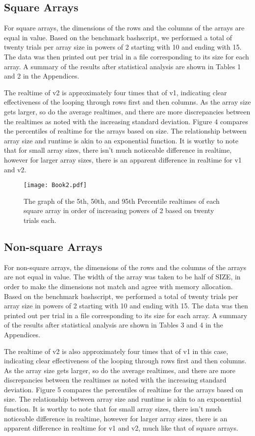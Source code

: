 \documentclass[a4paper]{article}
\begin{document}
\subsection{Square Arrays}
For square arrays, the dimensions of the rows and the columns of the arrays are equal in value. Based on the benchmark bashscript, we performed a total of twenty trials per array size in powers of 2 starting with 10 and ending with 15. The data was then printed out per trial in a file corresponding to its size for each array. A summary of the results after statistical analysis are shown in Tables 1 and 2 in the Appendices. 

The realtime of v2 is approximately four times that of v1, indicating clear effectiveness of the looping through rows first and then columns. As the array size gets larger,  so do the average realtimes, and there are more discrepancies between the realtimes as noted with the increasing standard deviation. Figure 4 compares the percentiles of realtime for the arrays based on size. The relationship between array size and runtime is akin to an exponential function. It is worthy to note that for small array sizes, there isn't much noticeable difference in realtime, however for larger array sizes, there is an apparent difference in realtime for v1 and v2.

\begin{figure}[H]
\centering
\texttt{[image: Book2.pdf]}
\caption{\label{fig:bashscript}The graph of the 5th, 50th, and 95th Percentile realtimes of each square array in order of increasing powers of 2 based on twenty trials each.}
\end{figure}

\subsection{Non-square Arrays}
For non-square arrays, the dimensions of the rows and the columns of the arrays are not equal in value. The width of the array was taken to be half of SIZE, in order to make the dimensions not match and agree with memory allocation. Based on the benchmark bashscript, we performed a total of twenty trials per array size in powers of 2 starting with 10 and ending with 15. The data was then printed out per trial in a file corresponding to its size for each array. A summary of the results after statistical analysis are shown in Tables 3 and 4 in the Appendices. 

The realtime of v2 is also approximately four times that of v1 in this case, indicating clear effectiveness of the looping through rows first and then columns. As the array size gets larger,  so do the average realtimes, and there are more discrepancies between the realtimes as noted with the increasing standard deviation. Figure 5 compares the percentiles of realtime for the arrays based on size. The relationship between array size and runtime is akin to an exponential function. It is worthy to note that for small array sizes, there isn't much noticeable difference in realtime, however for larger array sizes, there is an apparent difference in realtime for v1 and v2, much like that of square arrays.
\end{document}
